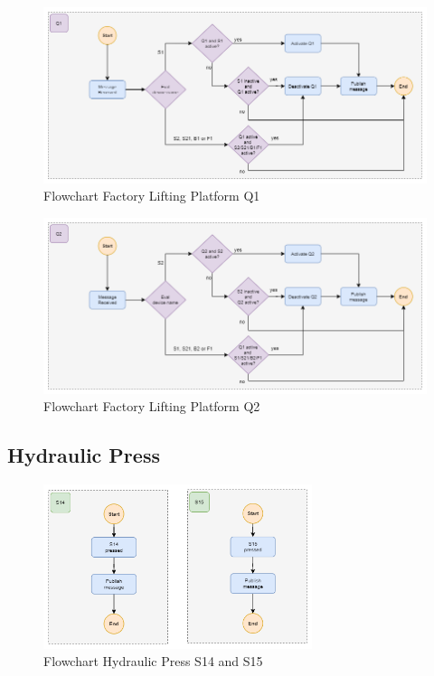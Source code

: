 \begin{figure}[H]
    \centering
    \includegraphics[width=1.0\textwidth]{images/flowchart_factory_lifter_q1.png}
    \caption{Flowchart Factory Lifting Platform Q1}
    \label{fig:FlowChartFactoryLifterQ1}
\end{figure}

\begin{figure}[H]
    \centering
    \includegraphics[width=1.0\textwidth]{images/flowchart_factory_lifter_q2.png}
    \caption{Flowchart Factory Lifting Platform Q2}
    \label{fig:FlowChartFactoryLifterQ2}
\end{figure}

\subsection*{Hydraulic Press}

\begin{figure}[H]
    \centering
    \includegraphics[width=0.7\textwidth]{images/flowchart_factory_press_s14_s15.png}
    \caption{Flowchart Hydraulic Press S14 and S15}
    \label{fig:FlowChartFactoryPressS14S15}
\end{figure}

